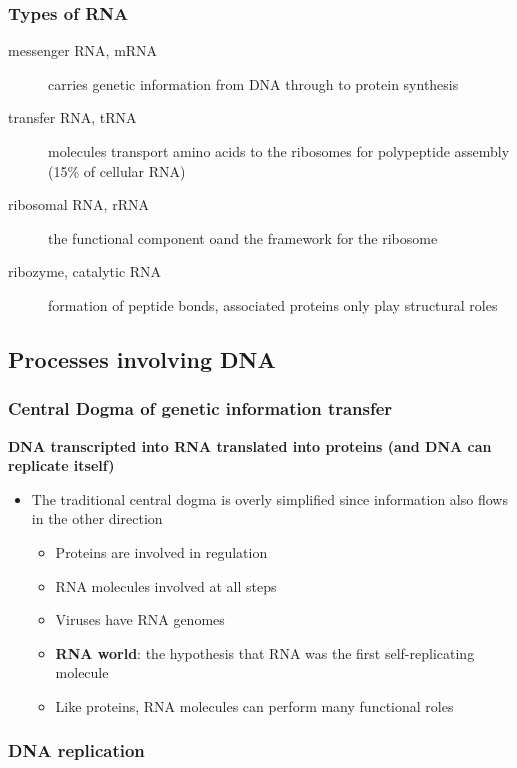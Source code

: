 \documentclass[letterpaper, 12pt]{article}
\begin{document}
\subsubsection*{Types of RNA}
\begin{description}
\item [messenger RNA, mRNA] carries genetic information from DNA through to protein synthesis
\item [transfer RNA, tRNA] molecules transport amino acids to the ribosomes for polypeptide assembly (15\% of cellular RNA)
\item [ribosomal RNA, rRNA] the functional component oand the framework for the ribosome
\item [ribozyme, catalytic RNA] formation of peptide bonds, associated proteins only play structural roles
\end{description}

\subsection*{Processes involving DNA}

\subsubsection*{Central Dogma of genetic information transfer}

\textbf{DNA transcripted into RNA translated into proteins (and DNA can replicate itself)}

\begin{itemize}
\item The traditional central dogma is overly simplified since information also flows in the other direction
\begin{itemize}
\item Proteins are involved in regulation
\item RNA molecules involved at all steps
\item Viruses have RNA genomes
\item \textbf{RNA world}: the hypothesis that RNA was the first self-replicating molecule
\item Like proteins, RNA molecules can perform many functional roles
\end{itemize}
\end{itemize}

\subsubsection*{DNA replication}
\end{document}

